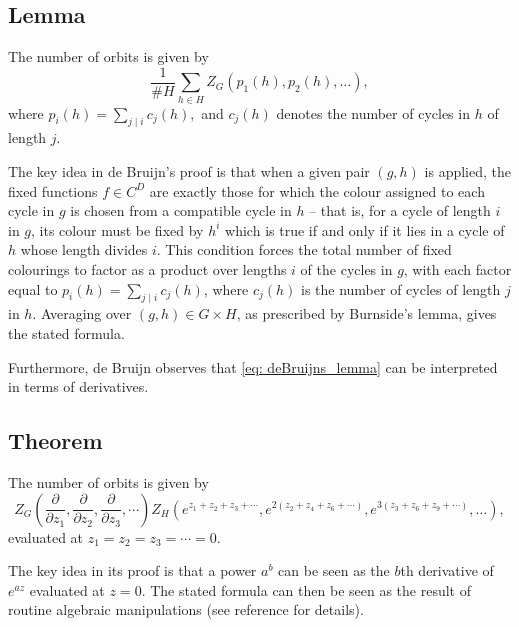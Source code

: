 \documentclass[a4paper,11pt]{article}
\numberwithin{equation}{section}
\begin{document}
    \subsection{Lemma} The number of orbits is given by 
    \begin{equation}\label{eq: deBruijns_lemma}
        \frac{1}{\# H} \sum_{h \in H} Z_G(p_1(h), p_2(h), \dots), 
    \end{equation}
    where \(p_i(h) = \sum_{ j \mid i} c_{j}(h),\) and $c_j(h)$ denotes the number of cycles in $h$ of length $j$. \newline

    The key idea in de Bruijn's proof \cite[Sect 5.12]{deBruijnAppliedCombinatorialMathematics} is that when a given pair \((g,h)\) is applied, the fixed functions \(f \in C^D\) are exactly those for which the colour assigned to each cycle in \(g\) is chosen from a compatible cycle in $h$  -- that is, for a cycle of length \(i\) in \(g\), its colour must be fixed by $h^i$ which is true if and only if it lies in a cycle of \(h\) whose length divides \(i\). This condition forces the total number of fixed colourings to factor as a product over lengths $i$ of the cycles in \(g\), with each factor equal to \(p_i(h)=\sum_{j\mid i} c_j(h)\), where \(c_j(h)\) is the number of cycles of length \(j\) in \(h\). Averaging over \( (g,h)\in G\times H\), as prescribed by Burnside’s lemma, gives the stated formula.\medskip

    Furthermore, de Bruijn observes that \eqref{eq: deBruijns_lemma} can be interpreted in terms of derivatives. 

    \subsection{Theorem} 
    The number of orbits is given by 
    \begin{equation*}
    Z_G\left(\frac{\partial}{\partial z_1}, \frac{\partial}{\partial z_2}, \frac{\partial}{\partial z_3},  
    \cdots \right) Z_H\left(e^{z_1+z_2+z_3+\cdots}, e^{2\left(z_2+z_4+z_6+\cdots\right)}, e^{3\left(z_3+z_6+z_9+\cdots\right)}, \ldots\right),
    \end{equation*}
    evaluated at $z_1=z_2 = z_3 = \cdots = 0$. \newline
    
    The key idea in its proof is that a power $a^b$ can be seen as the $b$th derivative of $e^{az}$ evaluated at $z=0$. The stated formula can then be seen as the result of routine algebraic manipulations (see reference for details). \smallskip
\end{document}
